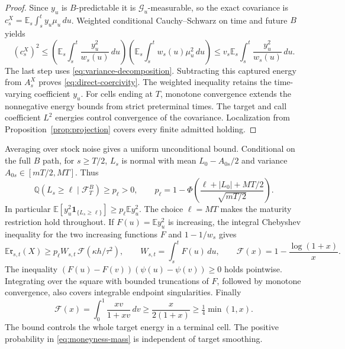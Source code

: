 \documentclass[11pt,a4paper]{amsart}
\theoremstyle{plain}
\theoremstyle{definition}
\theoremstyle{remark}
\newcommand{\EE}{\mathbb{E}}
\newcommand{\QQ}{\mathbb{Q}}
\newcommand{\F}{\mathcal F}
\newcommand{\G}{\mathcal G}
\newcommand{\Es}{\EE_s}
\begin{document}
\begin{proof}
Since $y_u$ is $B$-predictable it is $\G_u$-measurable, so the exact covariance is $c_s^X=\Es\int_s^t y_u\mu_u\,du$. Weighted conditional Cauchy--Schwarz on time and future $B$ yields
\begin{equation}\label{eq:true-weighted-cs}
 (c_s^X)^2\le
 \left(\Es\int_s^t\frac{y_u^2}{w_s(u)}\,du\right)
 \left(\Es\int_s^t w_s(u)\mu_u^2\,du\right)
 \le v_s\Es\int_s^t\frac{y_u^2}{w_s(u)}\,du.
\end{equation}
The last step uses \eqref{eq:variance-decomposition}. Subtracting this captured energy from $A_s^X$ proves \eqref{eq:direct-coercivity}. The weighted inequality retains the time-varying coefficient $y_u$. For cells ending at $T$, monotone convergence extends the nonnegative energy bounds from strict preterminal times. The target and call coefficient $L^2$ energies control convergence of the covariance. Localization from Proposition~\ref{prop:projection} covers every finite admitted holding.
\end{proof}

Averaging over stock noise gives a uniform unconditional bound. Conditional on the full $B$ path, for $s\ge T/2$, $L_s$ is normal with mean $L_0-A_{0s}/2$ and variance $A_{0s}\in[mT/2,MT]$. Thus
\begin{equation}\label{eq:moneyness-mass}
 \QQ(L_s\ge\ell\mid\F_T^B)\ge p_\ell>0,
 \qquad
 p_\ell=1-\Phi\left(\frac{\ell+|L_0|+MT/2}{\sqrt{mT/2}}\right).
\end{equation}
In particular $\EE[y_u^2\mathbf1_{\{L_s\ge\ell\}}]\ge p_\ell\EE y_u^2$. The choice $\ell=MT$ makes the maturity restriction hold throughout. If $F(u)=\EE y_u^2$ is increasing, the integral Chebyshev inequality for the two increasing functions $F$ and $1-1/w_s$ gives
\begin{equation}\label{eq:whole-cell-moneyness}
 \EE\mathfrak r_{s,t}(X)\ge
 p_\ell W_{s,t}\,\mathcal F(\kappa h/\tau^2),\qquad
 W_{s,t}=\int_s^tF(u)\,du,\qquad
 \mathcal F(x)=1-\frac{\log(1+x)}{x}.
\end{equation}
The inequality
$(F(u)-F(v))(\psi(u)-\psi(v))\ge0$ holds pointwise. Integrating over the square with bounded truncations of $F$, followed by monotone convergence, also covers integrable endpoint singularities. Finally
\begin{equation}\label{eq:moneyness-min}
 \mathcal F(x)=\int_0^1\frac{xv}{1+xv}\,dv
 \ge\frac{x}{2(1+x)}\ge\tfrac14\min(1,x).
\end{equation}
The bound controls the whole target energy in a terminal cell. The positive probability in \eqref{eq:moneyness-mass} is independent of target smoothing.
\end{document}
